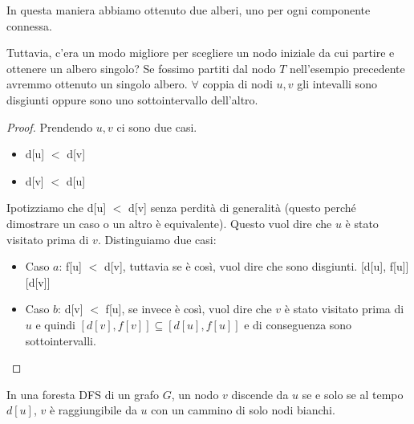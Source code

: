 \documentclass[a4paper]{article}
\begin{document}
{\begin{figure}[H]
\end{figure}
In questa maniera abbiamo ottenuto due alberi, uno per ogni componente connessa.
}
\noindent
Tuttavia, c'era un modo migliore per scegliere un nodo iniziale da cui partire e ottenere un albero singolo?
Se fossimo partiti dal nodo $T$ nell'esempio precedente avremmo ottenuto un singolo albero.
\thm{}
{
  $\forall$ coppia di nodi $u,v$ gli intevalli sono disgiunti oppure sono uno sottointervallo dell'altro.
}

\begin{proof}
  Prendendo $u,v$ ci sono due casi. 
  \begin{itemize}
    \item d[u] $<$ d[v]
    \item d[v] $<$ d[u]
  \end{itemize}
  Ipotizziamo che d[u] $<$ d[v] senza perdità di generalità (questo perché dimostrare un caso o un altro è equivalente). 
  Questo vuol dire che $u$ è stato visitato prima di $v$. 
  Distinguiamo due casi:
  \begin{itemize}
    \item Caso $a$: f[u] $<$ d[v], tuttavia se è così, vuol dire che sono disgiunti. [d[u], f[u]] [d[v]]
    \item Caso $b$: d[v] $<$ f[u], se invece è così, vuol dire che $v$ è stato visitato prima di $u$ e quindi $[d[v], f[v]] \subseteq [d[u], f[u]]$ e di conseguenza sono sottointervalli.
  \end{itemize}
\end{proof}

\thm{
}
{
  In una foresta DFS di un grafo $G$, un nodo $v$ discende da $u$ se e solo se al tempo
  $d[u]$, $v$ è raggiungibile da $u$ con un cammino di solo nodi bianchi.  
}
\end{document}
